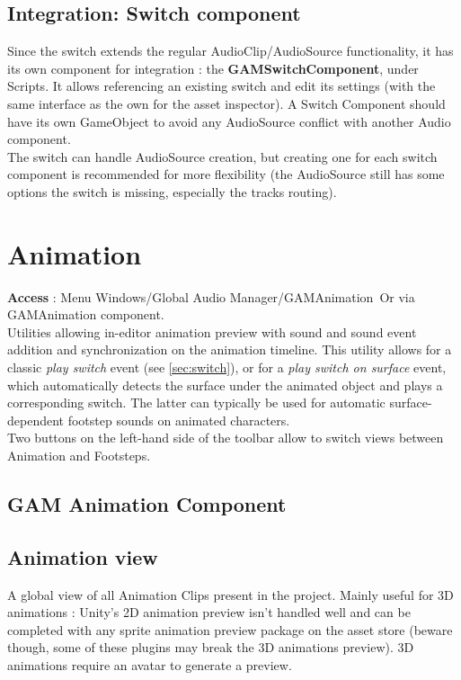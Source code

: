 \documentclass[a4paper,10pt]{article}
\begin{document}
\subsection{Integration: Switch component}
Since the switch extends the regular AudioClip/AudioSource functionality, it has its own component for integration : the \textbf{GAMSwitchComponent}, under Scripts. It allows referencing an existing switch and edit its settings (with the same interface as the own for the asset inspector). A Switch Component should have its own GameObject to avoid any AudioSource conflict with another Audio component. \\
The switch can handle AudioSource creation, but creating one for each switch component is recommended for more flexibility (the AudioSource still has some options the switch is missing, especially the tracks routing).


\section{Animation}

\textbf{Access} : Menu Windows/Global Audio Manager/GAMAnimation\
Or via GAMAnimation component.\\

Utilities allowing in-editor animation preview with sound and sound event addition and synchronization on the animation timeline. This utility allows for a classic \textit{play switch} event (see \autoref{sec:switch}), or for a \textit{play switch on surface} event, which automatically detects the surface under the animated object and plays a corresponding switch. The latter can typically be used for automatic surface-dependent footstep sounds on animated characters. \\
Two buttons on the left-hand side of the toolbar allow to switch views between Animation and Footsteps.

\subsection{GAM Animation Component}

\subsection{Animation view}
A global view of all Animation Clips present in the project. Mainly useful for 3D animations : Unity's 2D animation preview isn't handled well and can be completed with any sprite animation preview package on the asset store (beware though, some of these plugins may break the 3D animations preview). 3D animations require an avatar to generate a preview.\\
\end{document}
